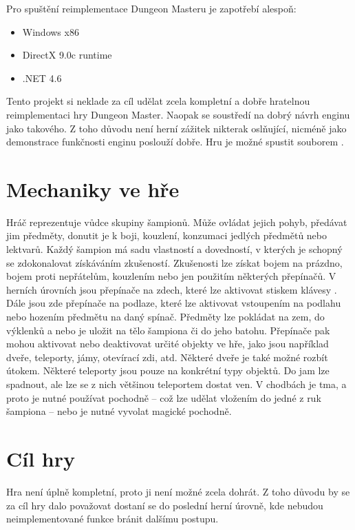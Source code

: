 Pro spuštění reimplementace Dungeon Masteru je zapotřebí alespoň:
\begin{itemize}
\item Windows x86 
\item DirectX 9.0c runtime  
\item .NET 4.6
\end{itemize}

Tento projekt si neklade za cíl udělat zcela kompletní a dobře hratelnou reimplementaci hry Dungeon Master.
Naopak se soustředí na dobrý návrh enginu jako takového. Z toho důvodu není herní zážitek nikterak
oslňující, nicméně jako demonstrace funkčnosti enginu poslouží dobře.
Hru je možné spustit souborem .

\section{Mechaniky ve hře}
Hráč reprezentuje vůdce skupiny šampionů. Může ovládat jejich pohyb,
předávat jim předměty, donutit je k boji, kouzlení, konzumaci jedlých předmětů nebo lektvarů.
Každý šampion má sadu vlastností a dovedností, v kterých je schopný se zdokonalovat získáváním zkušeností.
Zkušenosti lze získat bojem na prázdno, bojem proti nepřátelům, kouzlením nebo jen použitím některých přepínačů.
V herních úrovních jsou přepínače na zdech, které lze aktivovat stiskem klávesy . Dále jsou zde přepínače na 
podlaze, které lze aktivovat vstoupením na podlahu nebo hozením předmětu na daný spínač. Předměty lze
pokládat na zem, do výklenků a nebo je uložit na tělo šampiona či do jeho batohu. Přepínače pak mohou 
aktivovat nebo deaktivovat určité objekty ve hře, jako jsou například dveře, teleporty, jámy, otevírací
zdi, atd. Některé dveře je také možné rozbít útokem. Některé teleporty jsou pouze na konkrétní typy objektů.
Do jam lze spadnout, ale lze se z nich většinou teleportem dostat ven. V chodbách je tma, a proto je nutné 
používat pochodně -- což lze udělat vložením do jedné z ruk šampiona -- nebo je nutné vyvolat magické pochodně.

\section{Cíl hry}
Hra není úplně kompletní, proto ji není možné zcela dohrát. Z toho důvodu by se za cíl 
hry dalo považovat dostaní se do poslední herní úrovně, kde nebudou neimplementované funkce
bránit dalšímu postupu.

